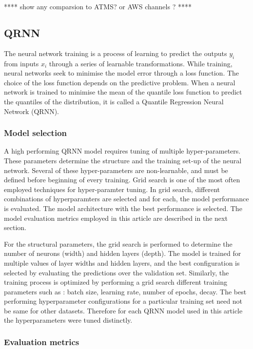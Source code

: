 \documentclass[amt, manuscript]{copernicus}
\begin{document}
**** show any comparsion to ATMS? or AWS channels ? ****

\subsection{QRNN}
%
The neural network training is a process of learning to predict the outputs {$y_i$} from inputs {$x_i$} through a series of learnable transformations. While training, neural networks seek to minimise the model error through a loss function. The choice of the loss function depends on the predictive problem. When a neural network is trained to minimise the mean of the quantile loss function to predict the quantiles of the distribution, it is called a Quantile Regression Neural Network (QRNN). 

 
\subsubsection{Model selection}
%
\label{model_selection}
A high performing QRNN model requires tuning of multiple hyper-parameters. These parameters determine the structure and the training set-up of the neural network. Several of these hyper-parameters are non-learnable, and must be defined before beginning of every training. Grid search is one of the most often employed techniques for hyper-paramter tuning. In grid search, different combinations of hyperparamters are selected and for each, the model performance is evaluated. The model architecture with the best performance is selected. The model evaluation metrics employed in this article are described in the next section. 

For the structural parameters, the grid search is performed to determine the number of neurons (width) and hidden layers (depth). The model is trained for multiple values of layer widths and hidden layers, and the best configuration is selected by evaluating the predictions over the validation set. Similarly, the training process is optimized by performing a grid search different training parameters such as : batch size, learning rate, number of epochs, decay. The best performing hyperparameter configurations for a particular training set need not be same for other datasets. Therefore for each QRNN model used in this article the hyperparameters were tuned distinctly. 

\subsubsection{Evaluation metrics}
\end{document}
